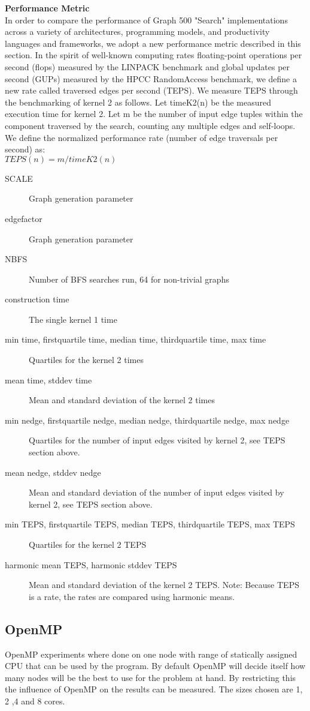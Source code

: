 \textbf{Performance Metric} \\
In order to compare the performance of Graph 500 "Search" implementations across a variety of architectures, programming models, and productivity languages and frameworks, we adopt a new performance metric described in this section. In the spirit of well-known computing rates floating-point operations per second (flops) measured by the LINPACK benchmark and global updates per second (GUPs) measured by the HPCC RandomAccess benchmark, we define a new rate called traversed edges per second (TEPS). We measure TEPS through the benchmarking of kernel 2 as follows. Let timeK2(n) be the measured execution time for kernel 2. Let m be the number of input edge tuples within the component traversed by the search, counting any multiple edges and self-loops. We define the normalized performance rate (number of edge traversals per second) as:
\\
$TEPS(n) = m / timeK2(n)$
\begin{description}
\item[SCALE] Graph generation parameter
\item[edgefactor] Graph generation parameter
\item[NBFS] Number of BFS searches run, 64 for non-trivial graphs
\item[construction time] The single kernel 1 time
\item[min time, firstquartile time, median time, thirdquartile time, max time] Quartiles for the kernel 2 times
\item[mean time, stddev time] Mean and standard deviation of the kernel 2 times
\item[min nedge, firstquartile nedge, median nedge, thirdquartile nedge, max nedge] Quartiles for the number of input edges visited by kernel 2, see TEPS section above.
\item[mean nedge, stddev nedge] Mean and standard deviation of the number of input edges visited by kernel 2, see TEPS section above.
\item[min TEPS, firstquartile TEPS, median TEPS, thirdquartile TEPS, max TEPS]  Quartiles for the kernel 2 TEPS
\item[harmonic mean TEPS, harmonic stddev TEPS] Mean and standard deviation of the kernel 2 TEPS. Note: Because TEPS is a rate, the rates are compared using harmonic means.

\end{description}

\subsection{OpenMP}
OpenMP experiments where done on one node with range of statically assigned CPU that can be used by the program. By default OpenMP will decide itself how many nodes will be the best to use for the problem at hand. By restricting this the influence of OpenMP on the results can be measured. The sizes chosen are 1, 2 ,4 and 8 cores. 

